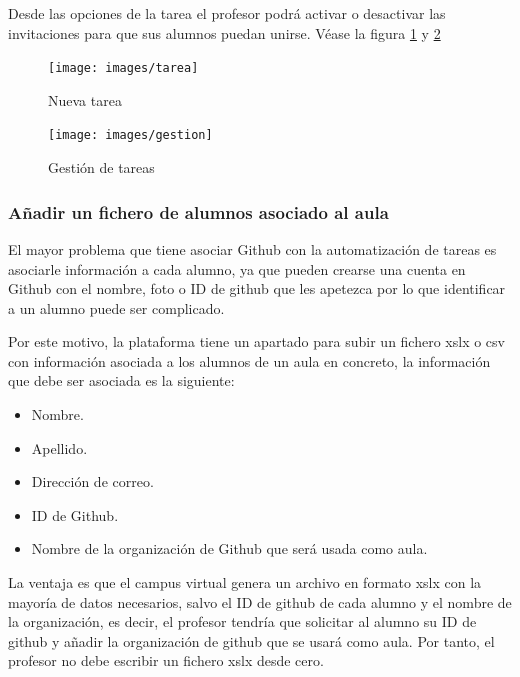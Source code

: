 Desde las opciones de la tarea el profesor podrá activar o desactivar las invitaciones para que sus alumnos puedan unirse.
Véase la figura \ref{fig:Nueva tarea} y \ref{fig:Gestion de tareas}

\begin{figure}[!th]
\begin{center}
\texttt{[image: images/tarea]}
\caption{Nueva tarea}
\label{fig:Nueva tarea}
\end{center}
\end{figure}

\begin{figure}[!th]
\begin{center}
\texttt{[image: images/gestion]}
\caption{Gestión de tareas}
\label{fig:Gestion de tareas}
\end{center}
\end{figure}

\newpage

\subsubsection{Añadir un fichero de alumnos asociado al aula}

El mayor problema que tiene asociar Github con la automatización de tareas es asociarle información a cada alumno, ya que pueden crearse una cuenta en Github con el nombre, foto o ID de github que les apetezca 
por lo que identificar a un alumno puede ser complicado. 

Por este motivo, la plataforma tiene un apartado para subir un fichero xslx o csv con información asociada a los alumnos de un aula en concreto, la información que debe ser asociada es la siguiente:

\begin{itemize}
  \item Nombre.
  \item Apellido.
  \item Dirección de correo.
  \item ID de Github.
  \item Nombre de la organización de Github que será usada como aula.
\end{itemize}

La ventaja es que el campus virtual genera un archivo en formato xslx con la mayoría de datos necesarios, salvo el ID de github de cada alumno y el nombre de la organización, es decir, el profesor tendría que solicitar al alumno su ID de github y añadir la organización de github que se usará como aula.
Por tanto, el profesor no debe escribir un fichero xslx desde cero.

